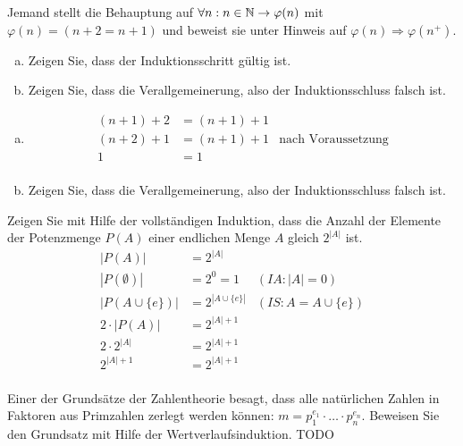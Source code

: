 \begin{card}
  Jemand stellt die Behauptung auf $\forall n : n \in \mathbb{N} \rightarrow \varphi(n)$ mit $\varphi(n) = (n+2 = n+1)$ und beweist sie unter Hinweis auf $\varphi(n) \Rightarrow \varphi(n^+)$.
  \begin{enumerate}[a)]
    \item Zeigen Sie, dass der Induktionsschritt gültig ist.
    \item Zeigen Sie, dass die Verallgemeinerung, also der Induktionsschluss falsch ist.
  \end{enumerate}
  \hr
  \begin{enumerate}[a)]
    \item
      \begin{align*}
        (n+1) + 2 &= (n+1) + 1 & \\
        (n+2) + 1 &= (n+1) + 1 & \text{nach Voraussetzung} \\
        1 &= 1 & \\
      \end{align*}
    \item Zeigen Sie, dass die Verallgemeinerung, also der Induktionsschluss falsch ist.
  \end{enumerate}
\end{card}

\begin{card}
  Zeigen Sie mit Hilfe der vollständigen Induktion, dass die Anzahl der Elemente der Potenzmenge $P(A)$ einer endlichen
  Menge $A$ gleich $2^{|A|}$ ist.
  \hr
  \begin{align*}
    |P(A)| &= 2^{|A|} & \\
    |P(\emptyset)| &= 2^0 = 1 & (IA: |A| = 0) \\
    |P(A \cup \{e\})| &= 2^{|A \cup \{e\}|} & (IS: A = A \cup \{e\}) \\
    2 \cdot |P(A)| &= 2^{|A|+1} & \\
    2 \cdot 2^{|A|} &= 2^{|A|+1} & \\
    2^{|A|+1} &= 2^{|A|+1} & \\
  \end{align*}
\end{card}

\begin{card}
  Einer der Grundsätze der Zahlentheorie besagt, dass alle natürlichen Zahlen in Faktoren aus Primzahlen zerlegt werden
  können: $m = p_1^{e_1} \cdot \ldots \cdot p_n^{e_n}$. Beweisen Sie den Grundsatz mit Hilfe der Wertverlaufsinduktion.
  \hr
  TODO
\end{card}

